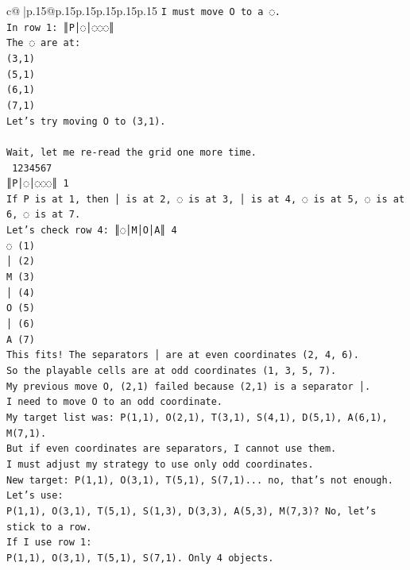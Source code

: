 \documentclass{article}
\begin{document}
{\begin{supertabular}{c@{$\;$}|p{.15\linewidth}@{}p{.15\linewidth}p{.15\linewidth}p{.15\linewidth}p{.15\linewidth}p{.15\linewidth}}
{{{\texttt{I must move O to a ◌.} \\
\texttt{In row 1: ║P│◌│◌◌◌║} \\
\texttt{The ◌ are at:} \\
\texttt{(3,1)} \\
\texttt{(5,1)} \\
\texttt{(6,1)} \\
\texttt{(7,1)} \\
\texttt{Let's try moving O to (3,1).} \\
\\ 
\texttt{Wait, let me re{-}read the grid one more time.} \\
\texttt{ 1234567} \\
\texttt{║P│◌│◌◌◌║ 1} \\
\texttt{If P is at 1, then │ is at 2, ◌ is at 3, │ is at 4, ◌ is at 5, ◌ is at 6, ◌ is at 7.} \\
\texttt{Let's check row 4: ║◌│M│O│A║ 4} \\
\texttt{◌ (1)} \\
\texttt{│ (2)} \\
\texttt{M (3)} \\
\texttt{│ (4)} \\
\texttt{O (5)} \\
\texttt{│ (6)} \\
\texttt{A (7)} \\
\texttt{This fits! The separators │ are at even coordinates (2, 4, 6).} \\
\texttt{So the playable cells are at odd coordinates (1, 3, 5, 7).} \\
\texttt{My previous move O, (2,1) failed because (2,1) is a separator │.} \\
\texttt{I need to move O to an odd coordinate.} \\
\texttt{My target list was: P(1,1), O(2,1), T(3,1), S(4,1), D(5,1), A(6,1), M(7,1).} \\
\texttt{But if even coordinates are separators, I cannot use them.} \\
\texttt{I must adjust my strategy to use only odd coordinates.} \\
\texttt{New target: P(1,1), O(3,1), T(5,1), S(7,1)... no, that's not enough.} \\
\texttt{Let's use:} \\
\texttt{P(1,1), O(3,1), T(5,1), S(1,3), D(3,3), A(5,3), M(7,3)? No, let's stick to a row.} \\
\texttt{If I use row 1:} \\
\texttt{P(1,1), O(3,1), T(5,1), S(7,1). Only 4 objects.} \\
}}}
\end{supertabular}}
\end{document}
